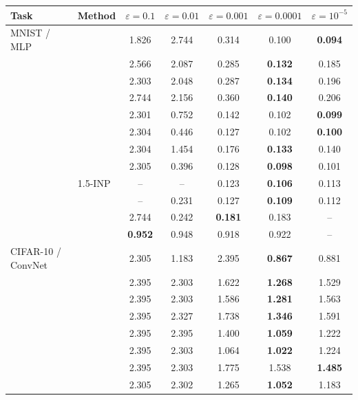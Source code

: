 \begin{tabular}{l l ccccc}
\toprule
Task & Method & $\varepsilon=0.1$ & $\varepsilon=0.01$ & $\varepsilon=0.001$ & $\varepsilon=0.0001$ & $\varepsilon=10^{-5}$ \\
\midrule
MNIST / MLP & \BP{} & 1.826 & 2.744 & 0.314 & 0.100 & \textbf{0.094} \\
 & \SPSA{} & 2.566 & 2.087 & 0.285 & \textbf{0.132} & 0.185 \\
 & \SPSAb{} & 2.303 & 2.048 & 0.287 & \textbf{0.134} & 0.196 \\
 & \RS{} & 2.744 & 2.156 & 0.360 & \textbf{0.140} & 0.206 \\
 & \NP{} & 2.301 & 0.752 & 0.142 & 0.102 & \textbf{0.099} \\
 & \ANP{} & 2.304 & 0.446 & 0.127 & 0.102 & \textbf{0.100} \\
 & \ANPb{} & 2.304 & 1.454 & 0.176 & \textbf{0.133} & 0.140 \\
 & \INP{} & 2.305 & 0.396 & 0.128 & \textbf{0.098} & 0.101 \\
 & 1.5-INP & -- & -- & 0.123 & \textbf{0.106} & 0.113 \\
 & \DUST{} & -- & 0.231 & 0.127 & \textbf{0.109} & 0.112 \\
 & \DANP{} & 2.744 & 0.242 & \textbf{0.181} & 0.183 & -- \\
 & \FF{} & \textbf{0.952} & 0.948 & 0.918 & 0.922 & -- \\
\midrule
CIFAR-10 / ConvNet & \BP{} & 2.305 & 1.183 & 2.395 & \textbf{0.867} & 0.881 \\
 & \SPSA{} & 2.395 & 2.303 & 1.622 & \textbf{1.268} & 1.529 \\
 & \SPSAb{} & 2.395 & 2.303 & 1.586 & \textbf{1.281} & 1.563 \\
 & \RS{} & 2.395 & 2.327 & 1.738 & \textbf{1.346} & 1.591 \\
 & \NP{} & 2.395 & 2.395 & 1.400 & \textbf{1.059} & 1.222 \\
 & \ANP{} & 2.395 & 2.303 & 1.064 & \textbf{1.022} & 1.224 \\
 & \ANPb{} & 2.395 & 2.303 & 1.775 & 1.538 & \textbf{1.485} \\
 & \INP{} & 2.305 & 2.302 & 1.265 & \textbf{1.052} & 1.183 \\

\end{tabular}
